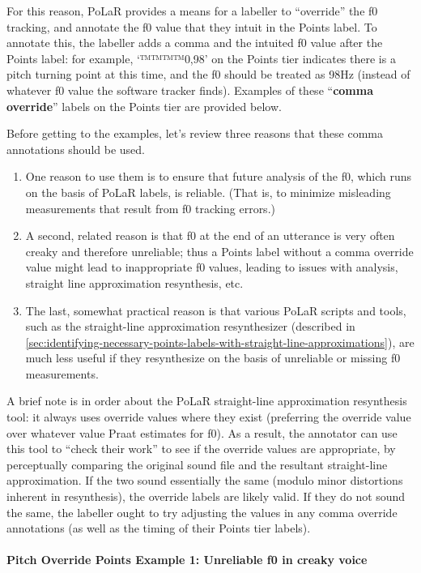 \documentclass[11pt, twoside]{memoir}
\begin{document}
For this reason, PoLaR provides a means for a labeller to “override” the f0 tracking, and annotate the f0 value that they intuit in the Points label. To annotate this, the labeller adds a comma and the intuited f0 value after the Points label: for example, ‘™™™™{0,98}’ on the Points tier indicates there is a pitch turning point at this time, and the f0 should be treated as 98Hz (instead of whatever f0 value the software tracker finds). Examples of these “\textbf{comma override}” labels on the Points tier are provided below.

Before getting to the examples, let’s review three reasons that these comma annotations should be used.
\begin{enumerate}
	\item One reason to use them is to ensure that future analysis of the f0, which runs on the basis of PoLaR labels, is reliable. (That is, to minimize misleading measurements that result from f0 tracking errors.)
	\item A second, related reason is that f0 at the end of an utterance is very often creaky and therefore unreliable; thus a Points label without a comma override value might lead to inappropriate f0 values, leading to issues with analysis, straight line approximation resynthesis, etc.
	\item The last, somewhat practical  reason is that various PoLaR scripts and tools, such as the straight-line approximation resynthesizer (described in \ref{sec:identifying-necessary-points-labels-with-straight-line-approximations}), are much less useful if they resynthesize on the basis of unreliable or missing f0 measurements.
\end{enumerate}

A brief note is in order about the PoLaR straight-line approximation resynthesis tool: it always uses override values where they exist (preferring the override value over whatever value Praat estimates for f0). As a result, the annotator can use this tool to “check their work” to see if the override values are appropriate, by perceptually comparing the original sound file and the resultant straight-line approximation. If the two sound essentially the same (modulo minor distortions inherent in resynthesis), the override labels are likely valid. If they do not sound the same, the labeller ought to try adjusting the values in any comma override annotations (as well as the timing of their Points tier labels).

\paragraph{Pitch Override Points Example 1: Unreliable f0 in creaky voice\label{pitch-override-points-example-1}}
\end{document}
